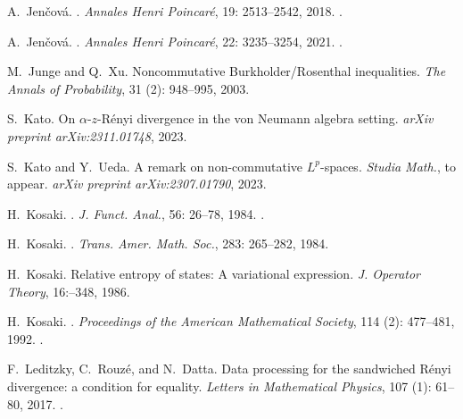 \documentclass[12pt]{article}
\theoremstyle{definition}
\theoremstyle{remark}
\numberwithin{equation}{section}
\begin{document}
\begin{thebibliography}{27}
A.~Jen{\v c}ov{\'a}.
.
\newblock \emph{Annales Henri Poincar{\'e}}, 19: 2513--2542, 2018.
\newblock {}.

A.~Jen{\v{c}}ov{\'a}.
.
\newblock \emph{Annales Henri Poincar{\'e}}, 22: 3235–3254, 2021.
\newblock {}.

M.~Junge and Q.~Xu.
\newblock Noncommutative {B}urkholder/{R}osenthal inequalities.
\newblock \emph{The Annals of Probability}, 31 (2): 948--995,
  2003.

S.~Kato.
\newblock On $\alpha $-$ z $-{R}\'enyi divergence in the von {N}eumann algebra
  setting.
\newblock \emph{arXiv preprint arXiv:2311.01748}, 2023.

S.~Kato and Y.~Ueda.
\newblock A remark on non-commutative {$L^p$}-spaces.
{\color{red}\newblock \emph{Studia Math.}, to appear.}
\newblock \emph{arXiv preprint arXiv:2307.01790}, 2023.

H.~Kosaki.
.
\newblock \emph{J. Funct. Anal.}, {56}: 26--78,
  {1984}{}.
\newblock {}.

H.~Kosaki.
.
\newblock \emph{Trans. Amer. Math. Soc.}, {283}: 265--282,
  {1984}{}.

H.~Kosaki.
\newblock Relative entropy of states: A variational expression.
\newblock \emph{J. Operator Theory}, 16:--348, 1986.

H.~Kosaki.
.
\newblock \emph{Proceedings of the American Mathematical Society}, 114
  (2): 477--481, 1992.
\newblock {}.

F.~Leditzky, C.~Rouz{\'e}, and N.~Datta.
\newblock Data processing for the sandwiched {R}{\'e}nyi divergence: a
  condition for equality.
\newblock \emph{Letters in Mathematical Physics}, 107 (1):
  61--80, 2017.
\newblock {}.


\end{thebibliography}
\end{document}
